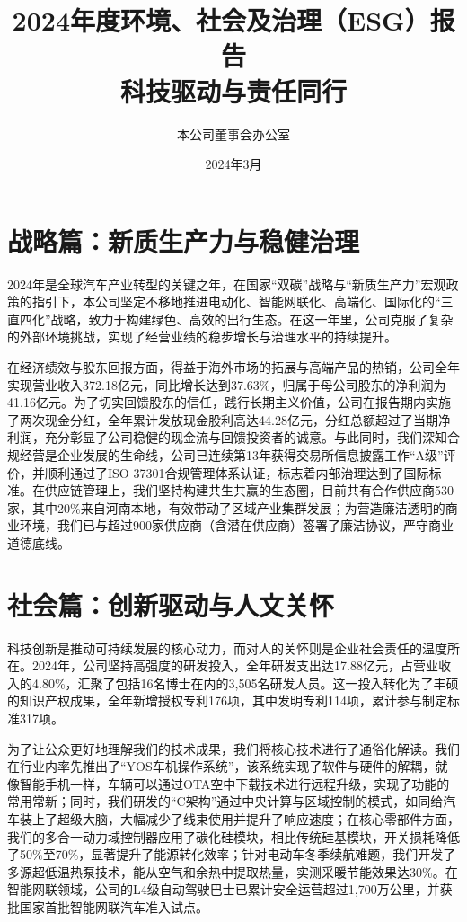 \documentclass[a4paper,12pt]{article}
\title{\textbf{\huge 2024年度环境、社会及治理（ESG）报告}\\ \vspace{0.5em} \large 科技驱动与责任同行}
\author{本公司董事会办公室}
\date{2024年3月}
\begin{document}
\maketitle

\section{战略篇：新质生产力与稳健治理}

2024年是全球汽车产业转型的关键之年，在国家“双碳”战略与“新质生产力”宏观政策的指引下，本公司坚定不移地推进电动化、智能网联化、高端化、国际化的“三直四化”战略，致力于构建绿色、高效的出行生态。在这一年里，公司克服了复杂的外部环境挑战，实现了经营业绩的稳步增长与治理水平的持续提升。

在经济绩效与股东回报方面，得益于海外市场的拓展与高端产品的热销，公司全年实现营业收入372.18亿元，同比增长达到37.63\%，归属于母公司股东的净利润为41.16亿元。为了切实回馈股东的信任，践行长期主义价值，公司在报告期内实施了两次现金分红，全年累计发放现金股利高达44.28亿元，分红总额超过了当期净利润，充分彰显了公司稳健的现金流与回馈投资者的诚意。与此同时，我们深知合规经营是企业发展的生命线，公司已连续第13年获得交易所信息披露工作“A级”评价，并顺利通过了ISO 37301合规管理体系认证，标志着内部治理达到了国际标准。在供应链管理上，我们坚持构建共生共赢的生态圈，目前共有合作供应商530家，其中20\%来自河南本地，有效带动了区域产业集群发展；为营造廉洁透明的商业环境，我们已与超过900家供应商（含潜在供应商）签署了廉洁协议，严守商业道德底线。

\section{社会篇：创新驱动与人文关怀}

科技创新是推动可持续发展的核心动力，而对人的关怀则是企业社会责任的温度所在。2024年，公司坚持高强度的研发投入，全年研发支出达17.88亿元，占营业收入的4.80\%，汇聚了包括16名博士在内的3,505名研发人员。这一投入转化为了丰硕的知识产权成果，全年新增授权专利176项，其中发明专利114项，累计参与制定标准317项。

为了让公众更好地理解我们的技术成果，我们将核心技术进行了通俗化解读。我们在行业内率先推出了“YOS车机操作系统”，该系统实现了软件与硬件的解耦，就像智能手机一样，车辆可以通过OTA空中下载技术进行远程升级，实现了功能的常用常新；同时，我们研发的“C架构”通过中央计算与区域控制的模式，如同给汽车装上了超级大脑，大幅减少了线束使用并提升了响应速度；在核心零部件方面，我们的多合一动力域控制器应用了碳化硅模块，相比传统硅基模块，开关损耗降低了50\%至70\%，显著提升了能源转化效率；针对电动车冬季续航难题，我们开发了多源超低温热泵技术，能从空气和余热中提取热量，实测采暖节能效果达30\%。在智能网联领域，公司的L4级自动驾驶巴士已累计安全运营超过1,700万公里，并获批国家首批智能网联汽车准入试点。
\end{document}
